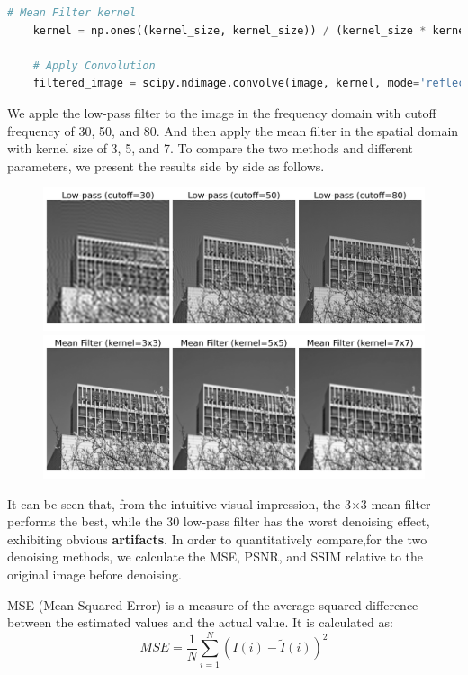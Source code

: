 \documentclass[12pt, a4paper, oneside]{ctexart}
\begin{document}
\begin{lstlisting}[style=mystyle,language=Python]
	# Mean Filter kernel
	kernel = np.ones((kernel_size, kernel_size)) / (kernel_size * kernel_size)
		
	# Apply Convolution
	filtered_image = scipy.ndimage.convolve(image, kernel, mode='reflect')

\end{lstlisting}

We apple the low-pass filter to the image in the frequency domain with cutoff frequency of 30, 50, and 80. And then apply the mean filter in the spatial domain with kernel size of 3, 5, and 7. To compare the two methods and different parameters, we present the results side by side as follows.



\begin{figure}[h]
	\centering
	\includegraphics[width=1\textwidth]{./result/frequency_domain_results.png}
	\includegraphics[width=1\textwidth]{./result/spatial_domain_results.png}
\end{figure}

It can be seen that, from the intuitive visual impression, the 3$\times$3 mean filter performs the best, while the 30 low-pass filter has the worst denoising effect, exhibiting obvious \textbf{artifacts}. In order to quantitatively compare,for the two denoising methods, we calculate the MSE, PSNR, and SSIM relative to the original image before denoising. 

MSE (Mean Squared Error) is a measure of the average squared difference between the estimated values and the actual value. It is calculated as:
\[
MSE = \frac{1}{N}\sum_{i=1}^{N} (I(i) - \tilde{I}(i))^2
\]
\end{document}
